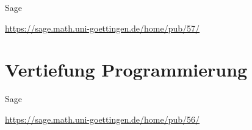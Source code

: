 \documentclass[notes=hide,hyperref={dvipdfmx,pdfpagelabels=false}]{beamer}
\begin{document}
\begin{frame}{Sage}
    \begin{center}
        \url{https://sage.math.uni-goettingen.de/home/pub/57/}
    \end{center}
\end{frame}

\section{Vertiefung Programmierung}


\begin{frame}{Sage}
    \begin{center}
        \url{https://sage.math.uni-goettingen.de/home/pub/56/}
    \end{center}
\end{frame}

% 



\end{document}
